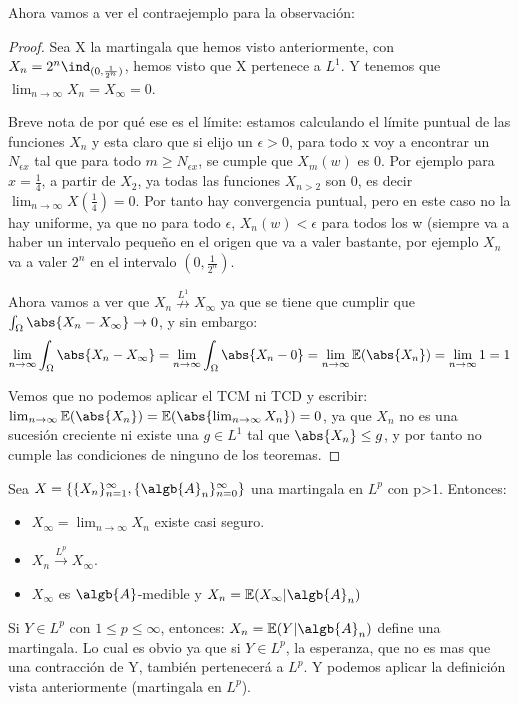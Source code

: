 \documentclass{apuntes}
\begin{document}
Ahora vamos a ver el contraejemplo para la observación:
\begin{proof}
Sea X la martingala que hemos visto anteriormente, con $X_n=  2^n \ind_{(0, \frac{1}{2^n})}$, hemos visto que X pertenece a $L^1$. Y tenemos que $\lim_{n \rightarrow \infty} X_n = X_{\infty} = 0$.

Breve nota de por qué ese es el límite: estamos calculando el límite puntual de las funciones $X_n$ y esta claro que si elijo un $\epsilon >0$, para todo x voy a encontrar un $N_{\epsilon x}$ tal que para todo $m \geq N_{\epsilon x}$, se cumple que $X_m(w)$ es 0. Por ejemplo para $x=\frac{1}{4}$, a partir de $X_2$, ya todas las funciones $X_{n>2}$ son 0, es decir $\lim_{n \rightarrow \infty} X(\frac{1}{4})=0$. Por tanto hay convergencia puntual, pero en este caso no la hay uniforme, ya que no para todo $\epsilon$, $X_n(w)<\epsilon$ para todos los w (siempre va a haber un intervalo pequeño en el origen que va a valer bastante, por ejemplo $X_n$ va a valer $2^n$ en el intervalo $(0, \frac{1}{2^n})$.

Ahora vamos a ver que  $X_n \stackrel{L^1}{\nrightarrow} X_{\infty}$ ya que se tiene que cumplir que $\int_{\Omega} \abs{X_n - X_{\infty}} \rightarrow 0$, y sin embargo:
\[
\lim_{n \rightarrow \infty} \int_{\Omega} \abs{X_n - X_{\infty}} = \lim_{n \rightarrow \infty} \int_{\Omega} \abs{X_n - 0} = \lim_{n \rightarrow \infty} \mathbb{E}(\abs{X_n}) = \lim_{n \rightarrow \infty} 1 = 1
\]

Vemos que no podemos aplicar el TCM ni TCD y escribir: $\lim_{n \rightarrow \infty} \mathbb{E}(\abs{X_n}) =  \mathbb{E}(\abs{\lim_{n \rightarrow \infty} X_n}) = 0$, ya que $X_n$ no es una sucesión creciente ni existe una $g \in L^1$ tal que $\abs{X_n} \leq g$, y por tanto no cumple las condiciones de ninguno de los teoremas.

\end{proof}

\begin{theorem}

Sea $X=\{\{X_n\}_{n=1}^{\infty}, \{\algb{A}_n\}_{n=0}^{\infty}\}$ una martingala en $L^p$ con p>1. Entonces:
\begin{itemize}
\item $X_{\infty}=\lim_{n \rightarrow \infty} X_n$ existe casi seguro.
\item $X_n \stackrel{L^p}{\rightarrow} X_{\infty}$.

\item $X_{\infty}$ es $\algb{A}$-medible y $X_n=\mathbb{E}(X_{\infty}|\algb{A}_n)$
\end{itemize}
\obs Si $Y \in L^p$ con $1 \leq p \leq \infty$, entonces: $X_n= \mathbb{E}(Y|\algb{A}_n)$ define una martingala. Lo cual es obvio ya que si $Y \in L^p$, la esperanza, que no es mas que una contracción de Y, también pertenecerá a $L^p$. Y podemos aplicar la definición vista anteriormente (martingala en $L^p$).

\end{theorem}
\end{document}

